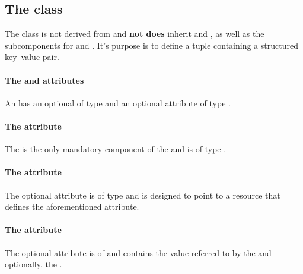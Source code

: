 \subsection{The \FBC {} class}
\label{keyvalue-class}

The \FBC \KeyValue class is not derived from \SBML \SBase and \textbf{not does} inherit
 and , as well as the subcomponents for
\Annotation and \Notes. It's purpose is to define a tuple containing a
structured key--value pair.

\paragraph{The  and  attributes}
An \UserConstraint has an optional  of type
 and an optional attribute  of type .

\paragraph{The  attribute}
The  is the only mandatory component of the \KeyValue and is of type .

\paragraph{The  attribute}
The optional attribute  is of type  and is designed to point to a resource that defines the aforementioned  attribute.

\paragraph{The  attribute}
The optional  attribute is of  and contains the value referred to by the  and optionally, the . 